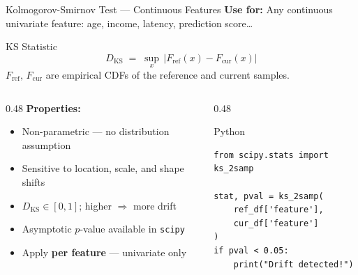 \documentclass[10pt,aspectratio=169]{beamer}
\begin{document}
\begin{frame}[fragile]{Kolmogorov-Smirnov Test --- Continuous Features}
  \textbf{Use for:} Any continuous univariate feature: age, income, latency, prediction score\ldots
  \vspace{0.15cm}
  \begin{block}{KS Statistic}
    \[
      D_{\mathrm{KS}} \;=\; \sup_{x}\,\bigl|F_{\mathrm{ref}}(x) - F_{\mathrm{cur}}(x)\bigr|
    \]
    $F_{\mathrm{ref}},\,F_{\mathrm{cur}}$ are empirical CDFs of the reference and current samples.
  \end{block}
  \vspace{0.15cm}
  \begin{columns}[T]
    \begin{column}{0.48\textwidth}
      \textbf{Properties:}
      \begin{itemize}
        \item Non-parametric --- no distribution assumption
        \item Sensitive to location, scale, and shape shifts
        \item $D_{\mathrm{KS}} \in [0,1]$; higher $\Rightarrow$ more drift
        \item Asymptotic $p$-value available in \texttt{scipy}
        \item Apply \textbf{per feature} --- univariate only
      \end{itemize}
    \end{column}
    \begin{column}{0.48\textwidth}
      \begin{exampleblock}{Python}
        \begin{lstlisting}[style=pycode]
from scipy.stats import ks_2samp

stat, pval = ks_2samp(
    ref_df['feature'],
    cur_df['feature']
)
if pval < 0.05:
    print("Drift detected!")
        \end{lstlisting}
      \end{exampleblock}
    \end{column}
  \end{columns}
\end{frame}
\end{document}
